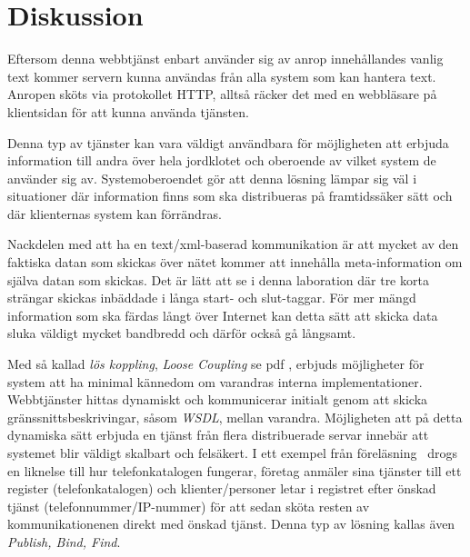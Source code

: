 \documentclass[a4paper, 12pt]{article}
\begin{document}
\section{Diskussion}\label{Diskussion}

Eftersom denna webbtjänst enbart använder sig av anrop innehållandes
vanlig text kommer servern kunna användas från alla system som kan
hantera text. Anropen sköts via protokollet HTTP, alltså räcker det
med en webbläsare på klientsidan för att kunna använda tjänsten.

Denna typ av tjänster kan vara väldigt användbara för möjligheten att
erbjuda information till andra över hela jordklotet och oberoende av
vilket system de använder sig av. Systemoberoendet gör att denna
lösning lämpar sig väl i situationer där information finns som ska
distribueras på framtidssäker sätt och där klienternas system kan
förrändras.

Nackdelen med att ha en text/xml-baserad kommunikation är att mycket
av den faktiska datan som skickas över nätet kommer att innehålla
meta-information om själva datan som skickas. Det är lätt att se i
denna laboration där tre korta strängar skickas inbäddade i långa
start- och slut-taggar. För mer mängd information som ska färdas långt
över Internet kan detta sätt att skicka data sluka väldigt mycket
bandbredd och därför också gå långsamt.

Med så kallad \textit{lös koppling}, \textit{Loose Coupling} se pdf
\cite{web:po}, erbjuds möjligheter för system att ha minimal kännedom
om varandras interna implementationer. Webbtjänster hittas dynamiskt
och kommunicerar initialt genom att skicka gränssnittsbeskrivingar,
såsom \textit{WSDL}, mellan varandra. Möjligheten att på detta
dynamiska sätt erbjuda en tjänst från flera distribuerade servar
innebär att systemet blir väldigt skalbart och felsäkert. I ett
exempel från föreläsning~\cite{lec:po} drogs en liknelse till hur
telefonkatalogen fungerar, företag anmäler sina tjänster till ett
register (telefonkatalogen) och klienter/personer letar i registret
efter önskad tjänst (telefonnummer/IP-nummer) för att sedan sköta
resten av kommunikationenen direkt med önskad tjänst. Denna typ av
lösning kallas även \textit{Publish, Bind, Find}.
\end{document}
